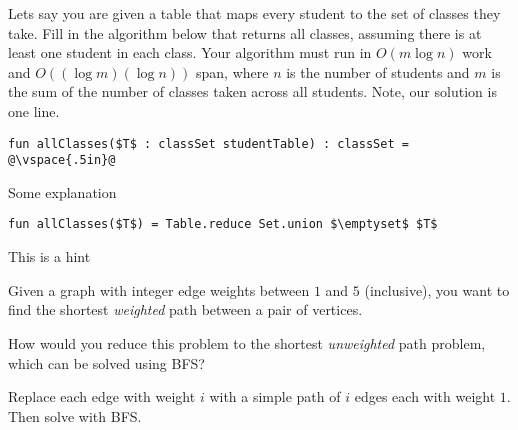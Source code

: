 \begin{problem}[20p][Classes]

Lets say you are given a table that maps every student to the set of
classes they take.  
Fill in the algorithm below that returns all classes,
assuming there is at least one student in each class.  Your algorithm
must run in $O(m \log n)$ work and $O((\log m)(\log n))$ span, where
$n$ is the number of students and $m$ is the sum of the number of
classes taken across all students.    Note, our solution is one line.

\ask[0.5] 

\begin{lstlisting}[numbers=none]
fun allClasses($T$ : classSet studentTable) : classSet = 
@\vspace{.5in}@
\end{lstlisting}

\explain[1] Some explanation 

\sol[4]
\begin{lstlisting}[numbers=none]
fun allClasses($T$) = Table.reduce Set.union $\emptyset$ $T$
\end{lstlisting}

\hint[2] This is a hint

\end{problem}

%

\begin{problem}

Given a graph with integer edge weights between $1$ and $5$
(inclusive), you want to find the shortest \emph{weighted} path
between a pair of vertices. 

\ask
How would you reduce this problem to the
shortest \emph{unweighted} path problem, which can be solved using
BFS?

\sol
Replace each edge with weight $i$ with a simple path of $i$ edges
each with weight $1$. Then solve with BFS.

\end{problem}


